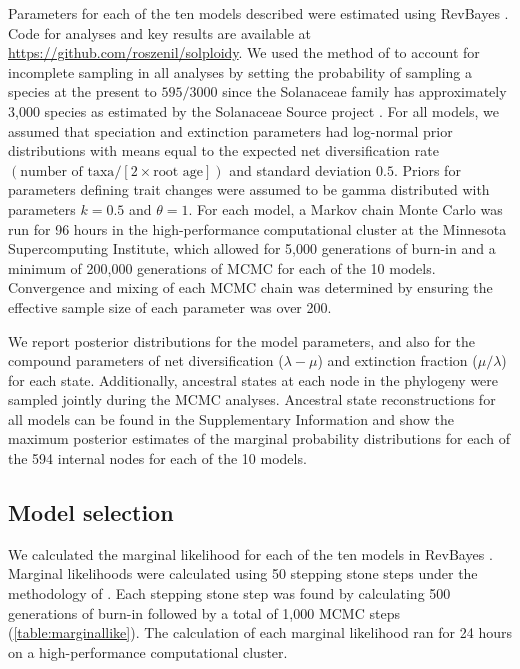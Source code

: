 Parameters for each of the ten models described were estimated using RevBayes \citep{hoehna_2016}.
Code for analyses and key results are available at \url{https://github.com/roszenil/solploidy}.
We used the method of \citet{fitzjohn_2009} to account for incomplete sampling in all analyses by setting the probability of sampling a species at the present to $595/3000$ since the Solanaceae family has approximately 3,000 species as estimated by the Solanaceae Source project \citep{solsource}.
For all models, we assumed that speciation and extinction parameters had log-normal prior distributions with means equal to the expected net diversification rate $(\text{number of taxa} / [2 \times \text{root age}])$ and standard deviation $0.5$.
Priors for parameters defining trait changes were assumed to be gamma distributed with parameters $k=0.5$ and $\theta=1$. 
For each model, a Markov chain Monte Carlo \citep[MCMC;][]{metropolis1953equation,Hastings1970} was run for 96 hours in the high-performance computational cluster at the Minnesota Supercomputing Institute, which allowed for 5,000 generations of burn-in and a minimum of 200,000 generations of MCMC for each of the 10 models. %
Convergence and mixing of each MCMC chain was determined by ensuring the effective sample size of each parameter was over 200.

We report posterior distributions for the model parameters, and also for the compound parameters of net diversification ($\lambda - \mu$) and extinction fraction ($\mu / \lambda$) for each state.
Additionally, ancestral states at each node in the phylogeny were sampled jointly during the MCMC analyses.
Ancestral state reconstructions for all models can be found in the Supplementary Information and show the maximum posterior estimates of the marginal probability distributions for each of the 594 internal nodes for each of the 10 models. %

\subsection{Model selection}

We calculated the marginal likelihood for each of the ten models in RevBayes \citep{hoehna_2016}.
Marginal likelihoods were calculated using 50 stepping stone steps under the methodology of \citet{xie_2010}.
Each stepping stone step was found by calculating 500 generations of burn-in followed by a total of 1,000 MCMC steps (\cref{table:marginallike}).
The calculation of each marginal likelihood ran for 24 hours on a high-performance computational cluster.

